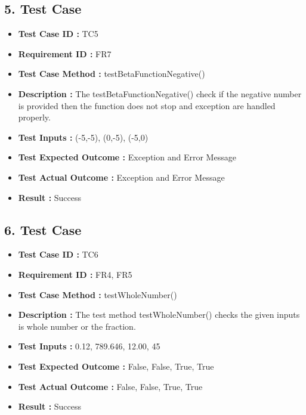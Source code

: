 \documentclass[a4paper, 12pt]{article}
\begin{document}
\subsection*{5. Test Case}
    \begin{itemize}
        \item \textbf{Test Case ID : } TC5
        \item \textbf{Requirement ID : } FR7
        \item \textbf{Test Case Method : } testBetaFunctionNegative()
        \item \textbf{Description : }The testBetaFunctionNegative() check if the negative number is provided then the function does not stop and exception are handled properly. 
        \item \textbf{Test Inputs : }(-5,-5), (0,-5), (-5,0)
        \item \textbf{Test Expected Outcome : }Exception and Error Message
        \item \textbf{Test Actual Outcome : }Exception and Error Message 
        \item \textbf{Result : }Success
    \end{itemize}
    
\subsection*{6. Test Case}
    \begin{itemize}
        \item \textbf{Test Case ID : } TC6
        \item \textbf{Requirement ID : } FR4, FR5
        \item \textbf{Test Case Method : } testWholeNumber()
        \item \textbf{Description : }The test method testWholeNumber() checks the given inputs is whole number or the fraction.  
        \item \textbf{Test Inputs : }0.12, 789.646, 12.00, 45
        \item \textbf{Test Expected Outcome : }False, False, True, True
        \item \textbf{Test Actual Outcome : }False, False, True, True 
        \item \textbf{Result : }Success
    \end{itemize}
\end{document}
